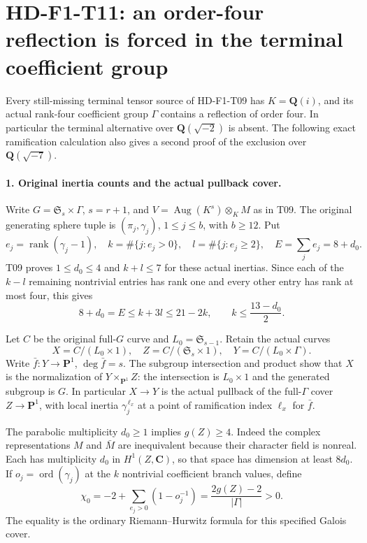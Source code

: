 \section[HD-F1-T11: the forced order-four reflection]{HD-F1-T11: an order-four reflection is forced in the terminal coefficient group}
\label{sec:f1-terminal-order-four}

Every still-missing terminal tensor source of HD-F1-T09 has
\(K=\mathbf Q(i)\), and its actual rank-four coefficient group
\(\Gamma\) contains a reflection of order four.
In particular the terminal alternative over
\(\mathbf Q(\sqrt{-2})\) is absent. The following exact
ramification calculation also gives a second proof of the
exclusion over \(\mathbf Q(\sqrt{-7})\).

\paragraph{1. Original inertia counts and the actual pullback cover.}
Write \(G=\mathfrak S_s\times\Gamma\), \(s=r+1\), and
\(V=\operatorname{Aug}(K^s)\otimes_K M\) as in T09.
The original generating sphere tuple is
\((\pi_j,\gamma_j)\), \(1\le j\le b\), with \(b\ge12\).
Put
\[
 e_j=\operatorname{rank}(\gamma_j-1),\quad
 k=\#\{j:e_j>0\},\quad
 l=\#\{j:e_j\ge2\},\quad E=\sum_j e_j=8+d_0 .
 \tag{F1T11.1}
\]
T09 proves \(1\le d_0\le4\) and \(k+l\le7\) for these
actual inertias. Since each of the \(k-l\) remaining
nontrivial entries has rank one and every other entry has
rank at most four, this gives
\[
            8+d_0=E\le k+3l\le21-2k,\qquad
                      k\le\frac{13-d_0}{2}.
 \tag{F1T11.2}
\]

Let \(C\) be the original full-\(G\) curve and
\(L_0=\mathfrak S_{s-1}\). Retain the actual curves
\[
 X=C/(L_0\times1),\quad
 Z=C/(\mathfrak S_s\times1),\quad
 Y=C/(L_0\times\Gamma).
 \tag{F1T11.3}
\]
Write \(\bar f:Y\to\mathbf P^1\), \(\deg\bar f=s\).
The subgroup intersection and product show that \(X\) is
the normalization of \(Y\times_{\mathbf P^1}Z\):
the intersection is \(L_0\times1\) and the generated
subgroup is \(G\). In particular \(X\to Y\) is the
actual pullback of the full-\(\Gamma\) cover
\(Z\to\mathbf P^1\), with local inertia
\(\gamma_j^{\,\ell_x}\) at a point of ramification
index \(\ell_x\) for \(\bar f\).

The parabolic multiplicity \(d_0\ge1\) implies
\(g(Z)\ge4\). Indeed the complex representations \(M\)
and \(\bar M\) are inequivalent because their character
field is nonreal. Each has multiplicity \(d_0\) in
\(H^1(Z,\mathbf C)\), so that space has dimension at
least \(8d_0\). If \(o_j=\operatorname{ord}(\gamma_j)\)
at the \(k\) nontrivial coefficient branch values, define
\[
 \chi_0=-2+\sum_{e_j>0}(1-o_j^{-1})
                    =\frac{2g(Z)-2}{|\Gamma|}>0 .
 \tag{F1T11.4}
\]
The equality is the ordinary Riemann--Hurwitz formula for
this specified Galois cover.

